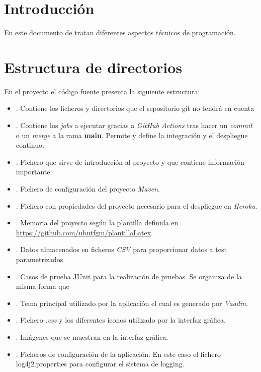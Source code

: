 \label{anex:D}

\section{Introducción}
En este documento de tratan diferentes aspectos técnicos de programación.

\section{Estructura de directorios}
En el proyecto el código fuente presenta la siguiente estructura:
\begin{itemize}
	\tightlist
	\item {}. Contiene los ficheros y directorios que el repositorio git no tendrá en cuenta
	\item {}. Contiene los \textit{jobs} a ejecutar gracias a \textit{GitHub Actions} tras hacer un \textit{commit} o un \textit{merge} a la rama \textbf{main}. Permite y define la integración y el despliegue continuo.
	\item {}. Fichero que sirve de introducción al proyecto y que contiene información importante.
	\item {}. Fichero de configuración del proyecto \textit{Maven}.
	\item {}. Fichero con propiedades del proyecto necesario para el despliegue en \textit{Heroku}.
	\item {}. Memoria del proyecto según la plantilla definida en \url{https://github.com/ubutfgm/plantillaLatex}.
	\item {}. Datos almacenados en ficheros \textit{CSV} para proporcionar datos a test parametrizados.
	\item {}. Casos de prueba JUnit para la realización de pruebas. Se organiza de la misma forma que 
	\item {}. Tema principal utilizado por la aplicación el cual es generado por \textit{Vaadin}.
	\item {}. Fichero \textit{.css} y los diferentes iconos utilizado por la interfaz gráfica.
	\item {}. Imágenes que se muestran en la interfaz gráfica.
	\item {}. Ficheros de configuración de la aplicación. En este caso el fichero log4j2.properties para configurar el sistema de logging.

\end{itemize}
